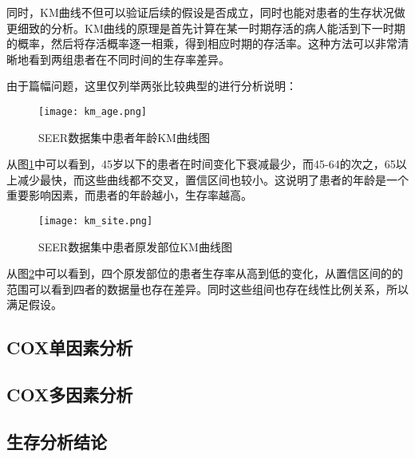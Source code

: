 同时，KM曲线不但可以验证后续的假设是否成立，同时也能对患者的生存状况做更细致的分析。KM曲线的原理是首先计算在某一时期存活的病人能活到下一时期的概率，然后将存活概率逐一相乘，得到相应时期的存活率。这种方法可以非常清晰地看到两组患者在不同时间的生存率差异。

由于篇幅问题，这里仅列举两张比较典型的进行分析说明：

\begin{figure}[!htbp]
    \centering
    \texttt{[image: km\_age.png]}
    \caption{SEER数据集中患者年龄KM曲线图} \label{fig:km_age}
\end{figure}

从图\ref{fig:km_age}中可以看到，45岁以下的患者在时间变化下衰减最少，而45-64的次之，65以上减少最快，而这些曲线都不交叉，置信区间也较小。这说明了患者的年龄是一个重要影响因素，而患者的年龄越小，生存率越高。

\begin{figure}[!htbp]
    \centering
    \texttt{[image: km\_site.png]}
    \caption{SEER数据集中患者原发部位KM曲线图} \label{fig:km_site}
\end{figure}

从图\ref{fig:km_site}中可以看到，四个原发部位的患者生存率从高到低的变化，从置信区间的的范围可以看到四者的数据量也存在差异。同时这些组间也存在线性比例关系，所以满足假设。

\subsection{COX单因素分析}

\subsection{COX多因素分析}

\subsection{生存分析结论}
